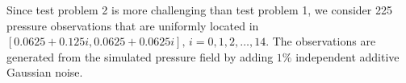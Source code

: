 
Since test problem 2 is more challenging than test problem 1, we consider 225 pressure observations that are uniformly located in $[0.0625 + 0.125i, 0.0625 + 0.0625i],\,i = 0, 1, 2,\dots, 14$. The observations are generated from the simulated pressure field by adding $1\%$ independent additive Gaussian noise. 


